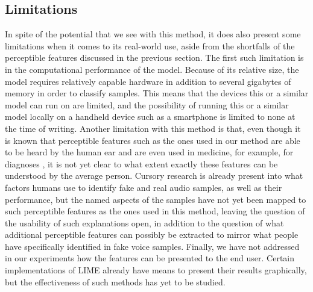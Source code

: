 \documentclass{article}
\begin{document}
		\subsection{Limitations}
		In spite of the potential that we see with this method, it does also present some
		limitations when it comes to its real-world use, aside from the shortfalls of the
		perceptible features discussed in the previous section. The first such limitation is in
		the computational performance of the model. Because of its relative size, the model
		requires relatively capable hardware in addition to several gigabytes of memory in order
		to classify samples. This means that the devices this or a similar model can run on are
		limited, and the possibility of running this or a similar model locally on a handheld
		device such as a smartphone is limited to none at the time of writing. Another limitation
		with this method is that, even though it is known that perceptible features such as the
		ones used in our method are able to be heard by the human ear and are even used in
		medicine, for example, for diagnoses \cite{chaiwongyen_deepfake-speech_2023}, it is not
		yet clear to what extent exactly these features can be understood by the average person.
		Cursory research \cite{warren_better_2024,sharevski_blind_2024} is already present into
		what factors humans use to identify fake and real audio samples, as well as their
		performance, but the named aspects of the samples have not yet been mapped to such
		perceptible features as the ones used in this method, leaving the question of the
		usability of such explanations open, in addition to the question of what additional
		perceptible features can possibly be extracted to mirror what people have specifically
		identified in fake voice samples. Finally, we have not addressed in our experiments how
		the features can be presented to the end user. Certain implementations of LIME already
		have means to present their results graphically, but the effectiveness of such methods has
		yet to be studied.
\end{document}

